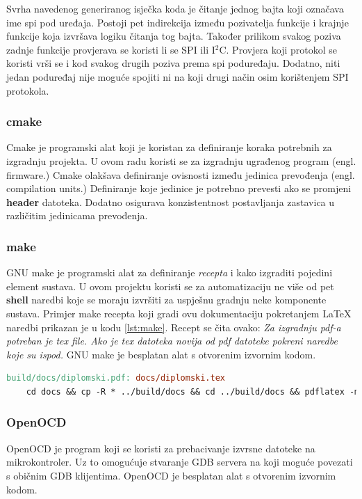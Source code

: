 \documentclass[times, utf8, diplomski]{diplomski}
\begin{document}
Svrha navedenog generiranog isječka koda je čitanje jednog bajta koji označava ime spi pod uređaja. Postoji pet indirekcija između pozivatelja funkcije i krajnje funkcije koja izvršava logiku čitanja tog bajta. Također prilikom svakog poziva zadnje funkcije provjerava se koristi li se SPI ili I\(^2\)C. Provjera koji protokol se koristi vrši se i kod svakog drugih poziva prema spi poduređaju. Dodatno, niti jedan poduređaj nije moguće spojiti ni na koji drugi način osim korištenjem SPI protokola.

\subsubsection{cmake}
Cmake je programski alat koji je koristan za definiranje koraka potrebnih za izgradnju projekta. U ovom radu koristi se za izgradnju ugrađenog program (engl. firmware.) Cmake olakšava definiranje ovisnosti između jedinica prevođenja (engl. compilation units.) Definiranje koje jedinice je potrebno prevesti ako se promjeni \textbf{header} datoteka. Dodatno osigurava konzistentnost postavljanja zastavica u različitim jedinicama prevođenja.

\subsubsection{make}
GNU make je programski alat za definiranje \textit{recepta} i kako izgraditi pojedini element sustava. U ovom projektu koristi se za automatizaciju ne više od pet \textbf{shell} naredbi koje se moraju izvršiti za uspješnu gradnju neke komponente sustava. Primjer make recepta koji gradi ovu dokumentaciju pokretanjem \LaTeX\cite{ungar2002uvod} naredbi prikazan je u kodu \ref{lst:make}. Recept se čita ovako: \textit{Za izgradnju pdf-a potreban je tex file. Ako je tex datoteka novija od pdf datoteke pokreni naredbe koje su ispod.} GNU make je besplatan alat s otvorenim izvornim kodom.

\begin{lstlisting}[language=make, label={lst:make}, caption={Gradnja dokumentacije korištenjem make recepta}]
build/docs/diplomski.pdf: docs/diplomski.tex
	cd docs && cp -R * ../build/docs && cd ../build/docs && pdflatex -mltex diplomski.tex && bibtex diplomski && pdflatex -mltex diplomski.tex
\end{lstlisting}

\subsubsection{OpenOCD}
OpenOCD\cite{openocd} je program koji se koristi za prebacivanje izvrsne datoteke na mikrokontroler. Uz to omogućuje stvaranje GDB servera na koji moguće povezati s običnim GDB klijentima. OpenOCD je besplatan alat s otvorenim izvornim kodom.
\end{document}
